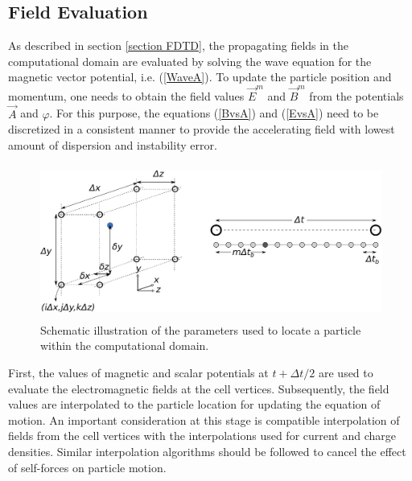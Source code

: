 \subsection{Field Evaluation}

As described in section \ref{section FDTD}, the propagating fields in the computational domain are evaluated by solving the wave equation for the magnetic vector potential, i.e. (\ref{WaveA}).
%
To update the particle position and momentum, one needs to obtain the field values $\vec{E}^m$ and $\vec{B}^m$ from the potentials $\vec{A}$ and $\varphi$.
%
For this purpose, the equations (\ref{BvsA}) and (\ref{EvsA}) need to be discretized in a consistent manner to provide the accelerating field with lowest amount of dispersion and instability error.
%
\begin{figure}
\centering
\includegraphics[height=2.0in]{./MITHRA_FDTDPIC/Fig1/Fig1.pdf}
\caption{Schematic illustration of the parameters used to locate a particle within the computational domain.}
\label{FDTDPICFig1}
\end{figure}
%
First, the values of magnetic and scalar potentials at $t+\Delta t/2$ are used to evaluate the electromagnetic fields at the cell vertices.
%
Subsequently, the field values are interpolated to the particle location for updating the equation of motion.
%
An important consideration at this stage is compatible interpolation of fields from the cell vertices with the interpolations used for current and charge densities.
%
Similar interpolation algorithms should be followed to cancel the effect of self-forces on particle motion.

